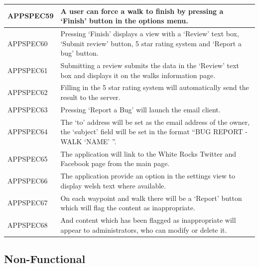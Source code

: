 \documentclass[11pt,a4paper]{article}
\begin{document}
\begin{longtable}{|p{2.5cm}p{13cm}|}
APPSPEC59 & A user can force a walk to finish by pressing a `Finish' button in the options menu. \\ \hline
APPSPEC60 & Pressing `Finish' displays a view with a `Review' text box, `Submit review' button, 5 star rating system and `Report a bug' button. \\ \hline
APPSPEC61 & Submitting a review submits the data in the `Review' text box and displays it on the walks information page.\\ \hline
APPSPEC62 & Filling in the 5 star rating system will automatically send the result to the server.\\ \hline
APPSPEC63 & Pressing `Report a Bug' will launch the email client. \\ \hline
APPSPEC64 & The `to' address will be set as the email address of the owner, the `subject' field will be set in the format ``BUG REPORT - WALK `NAME' ''.\\ \hline
APPSPEC65 & The application will link to the White Rocks Twitter and Facebook page from the main page.\\ \hline
APPSPEC66 & The application provide an option in the settings view to display welsh text where available. \\ \hline
APPSPEC67 & On each waypoint and walk there will be a `Report' button which will flag the content as inappropriate. \\ \hline
APPSPEC68 & And content which has been flagged as inappropriate will appear to administrators, who can modify or delete it. \\ \hline
\end{longtable}


\subsection{Non-Functional}
\label{sec:non-func-specs}
\end{document}
